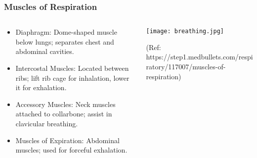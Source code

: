 \begin{frame}[fragile]\frametitle{Muscles of Respiration}
\begin{columns}
    \begin{column}[T]{0.5\linewidth}
      \begin{itemize}
		\item Diaphragm: Dome-shaped muscle below lungs; separates chest and abdominal cavities.
		\item Intercostal Muscles: Located between ribs; lift rib cage for inhalation, lower it for exhalation.
		\item Accessory Muscles: Neck muscles attached to collarbone; assist in clavicular breathing.
		\item Muscles of Expiration: Abdominal muscles; used for forceful exhalation.
	  \end{itemize}
    \end{column}
    \begin{column}[T]{0.5\linewidth}
		\begin{center}
		\texttt{[image: breathing.jpg]}
		
		{\tiny (Ref: https://step1.medbullets.com/respiratory/117007/muscles-of-respiration)}
		\end{center}	
    \end{column}
  \end{columns}
\end{frame}

